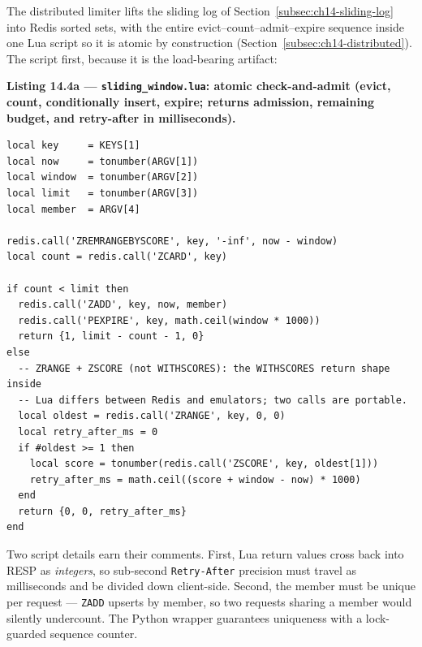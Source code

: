 The distributed limiter lifts the sliding log of
Section~\ref{subsec:ch14-sliding-log} into Redis sorted sets, with the
entire evict--count--admit--expire sequence inside one Lua script so it is
atomic by construction (Section~\ref{subsec:ch14-distributed}). The script
first, because it is the load-bearing artifact:

\noindent\textbf{Listing 14.4a --- \texttt{sliding\_window.lua}: atomic
check-and-admit (evict, count, conditionally insert, expire; returns
admission, remaining budget, and retry-after in milliseconds).}
\label{lst:ch14-redis-lua}
\begin{verbatim}
local key     = KEYS[1]
local now     = tonumber(ARGV[1])
local window  = tonumber(ARGV[2])
local limit   = tonumber(ARGV[3])
local member  = ARGV[4]

redis.call('ZREMRANGEBYSCORE', key, '-inf', now - window)
local count = redis.call('ZCARD', key)

if count < limit then
  redis.call('ZADD', key, now, member)
  redis.call('PEXPIRE', key, math.ceil(window * 1000))
  return {1, limit - count - 1, 0}
else
  -- ZRANGE + ZSCORE (not WITHSCORES): the WITHSCORES return shape inside
  -- Lua differs between Redis and emulators; two calls are portable.
  local oldest = redis.call('ZRANGE', key, 0, 0)
  local retry_after_ms = 0
  if #oldest >= 1 then
    local score = tonumber(redis.call('ZSCORE', key, oldest[1]))
    retry_after_ms = math.ceil((score + window - now) * 1000)
  end
  return {0, 0, retry_after_ms}
end
\end{verbatim}

Two script details earn their comments. First, Lua return values cross back
into RESP as \emph{integers}, so sub-second \texttt{Retry-After} precision
must travel as milliseconds and be divided down client-side. Second, the
member must be unique per request --- \texttt{ZADD} upserts by member, so
two requests sharing a member would silently undercount. The Python wrapper
guarantees uniqueness with a lock-guarded sequence counter.

